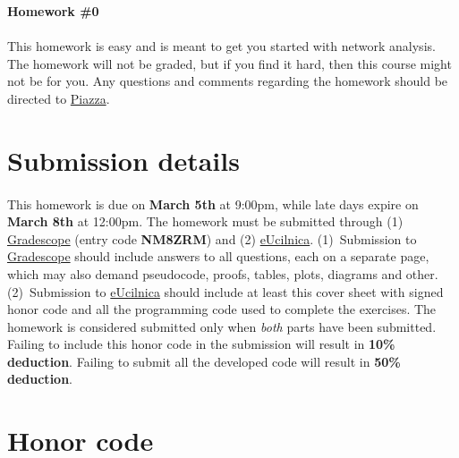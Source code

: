 \documentclass[11pt,a4paper]{article}
\begin{document}
 

\thispagestyle{titlestyle}

\vspace*{0.05in} 
\begin{center} 
	{\huge\bf Homework {\color{magenta}\#0}} 
\end{center} 
\vspace*{0.05in} 

\paragraph{} This homework is easy and is meant to get you started with network analysis. The homework will not be graded, but if you find it hard, then this course might not be for you. Any questions and comments regarding the homework should be directed to \href{https://piazza.com/class/kkn1oz577n2sq}{Piazza}.

\section*{Submission details}

\paragraph{} This homework is due on {\bf\color{magenta} March 5th} at 9:00pm, while late days expire on {\bf\color{magenta} March 8th} at 12:00pm. The homework must be submitted through (1) \href{https://www.gradescope.com}{Gradescope} (entry code {\bf NM8ZRM}) and (2) \href{https://ucilnica.fri.uni-lj.si/mod/assign/view.php?id=42257}{eUcilnica}. (1)~Submission to \href{https://www.gradescope.com}{Gradescope} should include answers to all questions, each on a separate page, which may also demand pseudocode, proofs, tables, plots, diagrams and other. (2)~Submission to \href{https://ucilnica.fri.uni-lj.si/mod/assign/view.php?id=42257}{eUcilnica} should include at least this cover sheet with signed honor code and all the programming code used to complete the exercises. The homework is considered submitted only when \textit{both} parts have been submitted. Failing to include this honor code in the submission will result in {\bf\color{LimeGreen} 10\% deduction}. Failing to submit all the developed code will result in {\bf\color{LimeGreen} 50\% deduction}.

\section*{Honor code}
\end{document}
